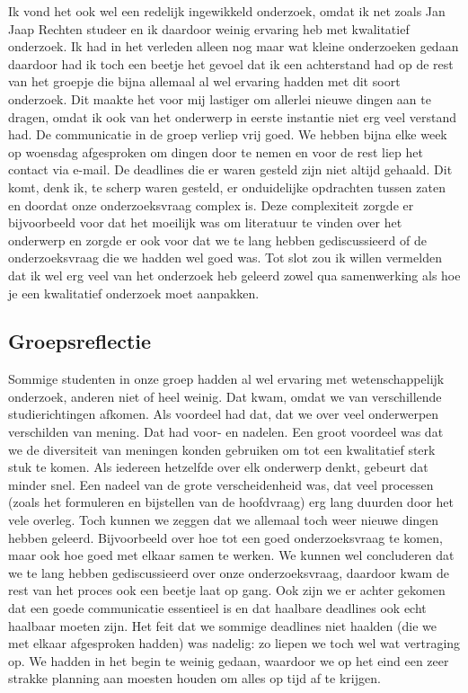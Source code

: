 \documentclass[a4paper,12pt]{memoir}
\begin{document}
Ik vond het ook wel een redelijk ingewikkeld onderzoek, omdat ik net zoals Jan Jaap Rechten studeer en ik daardoor weinig ervaring heb met kwalitatief onderzoek. Ik had in het verleden alleen nog maar wat kleine onderzoeken gedaan daardoor had ik toch een beetje het gevoel dat ik een achterstand had op de rest van het groepje die bijna allemaal al wel ervaring hadden met dit soort onderzoek. Dit maakte het voor mij lastiger om allerlei nieuwe dingen aan te dragen, omdat ik ook van het onderwerp in eerste instantie niet erg veel verstand had. De communicatie in de groep verliep vrij goed. We hebben bijna elke week op woensdag afgesproken om dingen door te nemen en voor de rest liep het contact via e-mail. De deadlines die er waren gesteld zijn niet altijd gehaald. Dit komt, denk ik, te scherp waren gesteld, er onduidelijke opdrachten tussen zaten en doordat onze onderzoeksvraag complex is. Deze complexiteit zorgde er bijvoorbeeld voor dat het moeilijk was om literatuur te vinden over het onderwerp en zorgde er ook voor dat we te lang hebben gediscussieerd of de onderzoeksvraag die we hadden wel goed was. Tot slot zou ik willen vermelden dat ik wel erg veel van het onderzoek heb geleerd zowel qua samenwerking als hoe je een kwalitatief onderzoek moet aanpakken.

\subsection{Groepsreflectie}

Sommige studenten in onze groep hadden al wel ervaring met wetenschappelijk onderzoek, anderen niet of heel weinig. Dat kwam, omdat we van verschillende studierichtingen afkomen. Als voordeel had dat, dat we over veel onderwerpen verschilden van mening. Dat had voor- en nadelen. Een groot voordeel was dat we de diversiteit van meningen konden gebruiken om tot een kwalitatief sterk stuk te komen. Als iedereen hetzelfde over elk onderwerp denkt, gebeurt dat minder snel. Een nadeel van de grote verscheidenheid was, dat veel processen (zoals het formuleren en bijstellen van de hoofdvraag) erg lang duurden door het vele overleg. Toch kunnen we zeggen dat we allemaal toch weer nieuwe dingen hebben geleerd. Bijvoorbeeld over hoe tot een goed onderzoeksvraag te komen, maar ook hoe goed met elkaar samen te werken. We kunnen wel concluderen dat we te lang hebben gediscussieerd over onze onderzoeksvraag, daardoor kwam de rest van het proces ook een beetje laat op gang. Ook zijn we er achter gekomen dat een goede communicatie essentieel is en dat haalbare deadlines ook echt haalbaar moeten zijn. Het feit dat we sommige deadlines niet haalden (die we met elkaar afgesproken hadden) was nadelig: zo liepen we toch wel wat vertraging op. We hadden in het begin te weinig gedaan, waardoor we op het eind een zeer strakke planning aan moesten houden om alles op tijd af te krijgen.
\end{document}
